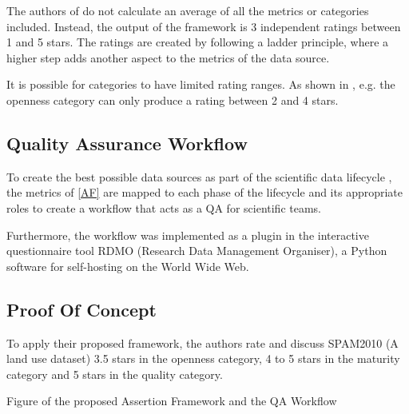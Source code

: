 \documentclass[conference]{IEEEtran}
\begin{document}
The authors of \cite{wagner2022quality} do not calculate an average of all the metrics or categories included. Instead, the output of the framework is 3 independent ratings between 1 and 5 stars. The ratings are created by following a ladder principle, where a higher step adds another aspect to the metrics of the data source.

It is possible for categories to have limited rating ranges. As shown in \cite{wagner2022quality}, e.g. the openness category can only produce a rating between 2 and 4 stars.

\subsection{Quality Assurance Workflow}\label{QAW}

To create the best possible data sources as part of the scientific data lifecycle \cite{wagner2022quality}, the metrics of \ref{AF} are mapped to each phase of the lifecycle and its appropriate roles to create a workflow that acts as a QA for scientific teams.

Furthermore, the workflow was implemented as a plugin in the interactive questionnaire tool RDMO (Research Data Management Organiser), a Python software for self-hosting on the World Wide Web.

\subsection{Proof Of Concept}\label{POC}

To apply their proposed framework, the authors rate and discuss SPAM2010 (A land use dataset) 3.5 stars in the openness category, 4 to 5 stars in the maturity category and 5 stars in the quality category.




\renewcommand{\refname}{Appendix}

\begin{thebibliography}{00}
\makeatletter
\addtocounter{\@listctr}{2}
\makeatother
{} Figure of the proposed Assertion Framework and the QA Workflow
\end{thebibliography}
\end{document}
